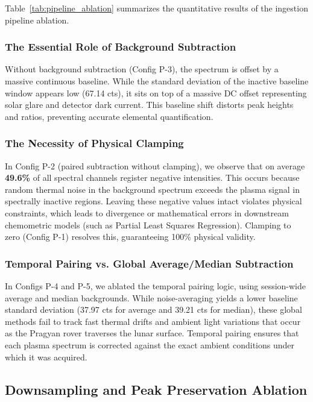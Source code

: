 Table~\ref{tab:pipeline_ablation} summarizes the quantitative results of the ingestion pipeline ablation.

\subsubsection{The Essential Role of Background Subtraction}
Without background subtraction (Config P-3), the spectrum is offset by a massive continuous baseline. While the standard deviation of the inactive baseline window appears low (67.14 cts), it sits on top of a massive DC offset representing solar glare and detector dark current. This baseline shift distorts peak heights and ratios, preventing accurate elemental quantification.

\subsubsection{The Necessity of Physical Clamping}
In Config P-2 (paired subtraction without clamping), we observe that on average \textbf{49.6\%} of all spectral channels register negative intensities. This occurs because random thermal noise in the background spectrum exceeds the plasma signal in spectrally inactive regions. Leaving these negative values intact violates physical constraints, which leads to divergence or mathematical errors in downstream chemometric models (such as Partial Least Squares Regression). Clamping to zero (Config P-1) resolves this, guaranteeing 100\% physical validity.

\subsubsection{Temporal Pairing vs. Global Average/Median Subtraction}
In Configs P-4 and P-5, we ablated the temporal pairing logic, using session-wide average and median backgrounds. While noise-averaging yields a lower baseline standard deviation (37.97 cts for average and 39.21 cts for median), these global methods fail to track fast thermal drifts and ambient light variations that occur as the Pragyan rover traverses the lunar surface. Temporal pairing ensures that each plasma spectrum is corrected against the exact ambient conditions under which it was acquired.

\subsection{Downsampling and Peak Preservation Ablation}

